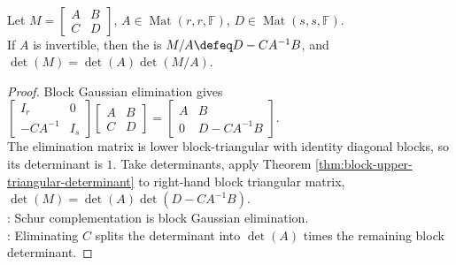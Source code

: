 \begin{proposition} \label{prop:schur-complement-determinant-formula} \\
Let $M=
\begin{bmatrix}
A & B\\
C & D
\end{bmatrix}$, $A\in\operatorname{Mat}(r,r,\mathbb{F})$, $D\in\operatorname{Mat}(s,s,\mathbb{F})$.\\
If $A$ is invertible, then the  is $M/A\defeq D-CA^{-1}B$, and $\det(M)=\det(A)\det(M/A)$.
\begin{proof}
Block Gaussian elimination gives $\begin{bmatrix}
I_r & 0\\
-CA^{-1} & I_s
\end{bmatrix}
\begin{bmatrix}
A & B\\
C & D
\end{bmatrix}
=
\begin{bmatrix}
A & B\\
0 & D-CA^{-1}B
\end{bmatrix}$.\\
The elimination matrix is lower block-triangular with identity diagonal blocks, so its determinant is $1$. Take determinants, apply Theorem \ref{thm:block-upper-triangular-determinant} to right-hand block triangular matrix, $\det(M)=\det(A)\det(D-CA^{-1}B)$.\\
: Schur complementation is block Gaussian elimination.\\
: Eliminating $C$ splits the determinant into $\det(A)$ times the remaining block determinant.
\end{proof}
\end{proposition}

